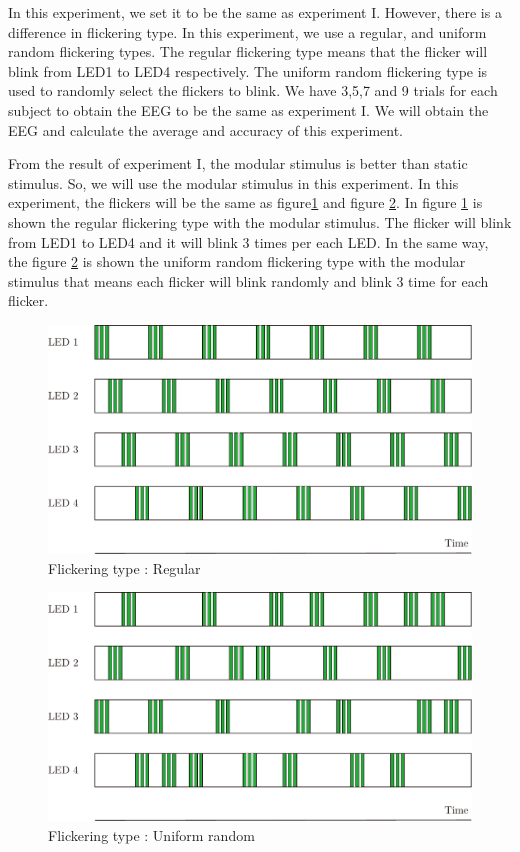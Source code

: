 In this experiment, we set it to be the same as experiment I. However, there is a difference in flickering type. In this experiment, we use a regular, and uniform random flickering types. The regular flickering type means that the flicker will blink from LED1 to LED4 respectively. The uniform random flickering type is used to randomly select the flickers to blink. We have 3,5,7 and 9 trials for each subject to obtain the EEG to be the same as experiment I. We will obtain the EEG and calculate the average and accuracy of this experiment.

From the result of experiment I, the modular stimulus is better than static stimulus. So, we will use the modular stimulus in this experiment. In this experiment, the flickers will be the same as figure\ref{fig:mod_reg} and figure \ref{fig:mod_uni}.
In figure \ref{fig:mod_reg} is shown the regular flickering type with the modular stimulus. The flicker will blink from LED1 to LED4 and it will blink 3 times per each LED. In the same way, the figure \ref{fig:mod_uni} is shown the uniform random flickering type with the modular stimulus that means each flicker will blink randomly and blink 3 time for each flicker.

\begin{figure}[ht]
	\centering
	\includegraphics[scale = 0.65]{chapter7/mod_nor.pdf}
	\caption{Flickering type : Regular}
    \label{fig:mod_reg}
\end{figure}

\begin{figure}[ht]
	\centering
	\includegraphics[scale = 0.65]{chapter7/mod_uni.pdf}
	\caption{Flickering type : Uniform random}
    \label{fig:mod_uni}
\end{figure}


